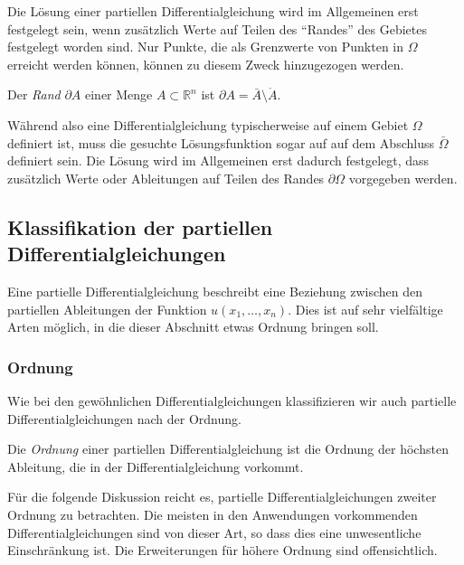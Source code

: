 Die Lösung einer partiellen Differentialgleichung wird im Allgemeinen erst
festgelegt sein, wenn zusätzlich Werte auf Teilen des ``Randes'' des
Gebietes festgelegt worden sind.
Nur Punkte, die als Grenzwerte von Punkten in $\Omega$ erreicht werden
können, können zu diesem Zweck hinzugezogen werden.

\begin{definition}
Der {\em Rand} $\partial A$ einer Menge $A\subset\mathbb R^n$ ist
$\partial A=\bar{A}\setminus\mathring{A}$.
%
%
\end{definition}

Während also eine Differentialgleichung typischerweise auf einem
Gebiet $\Omega$ definiert ist, muss die gesuchte Lösungsfunktion
sogar auf auf dem Abschluss $\bar{\Omega}$ definiert sein.
Die Lösung wird im Allgemeinen erst dadurch festgelegt, dass zusätzlich
Werte oder Ableitungen auf Teilen des Randes $\partial\Omega$ 
vorgegeben werden.

\subsection{Klassifikation der partiellen Differentialgleichungen
\label{subsection:pde:klassifikation}}
Eine partielle Differentialgleichung beschreibt eine Beziehung 
zwischen den partiellen Ableitungen der Funktion $u(x_1,\dots,x_n)$.
Dies ist auf sehr vielfältige Arten möglich, in die dieser Abschnitt
etwas Ordnung bringen soll.

\subsubsection{Ordnung}
Wie bei den gewöhnlichen Differentialgleichungen klassifizieren wir
auch partielle Differentialgleichungen nach der Ordnung.
%
%

\begin{definition}
Die {\em Ordnung} einer partiellen Differentialgleichung ist die
Ordnung der höchsten Ableitung, die in der Differentialgleichung
vorkommt.
%
\end{definition}

Für die folgende Diskussion reicht es, partielle Differentialgleichungen
zweiter Ordnung zu betrachten.
Die meisten in den Anwendungen vorkommenden Differentialgleichungen
sind von dieser Art, so dass dies eine unwesentliche Einschränkung ist.
Die Erweiterungen für höhere Ordnung sind offensichtlich.

